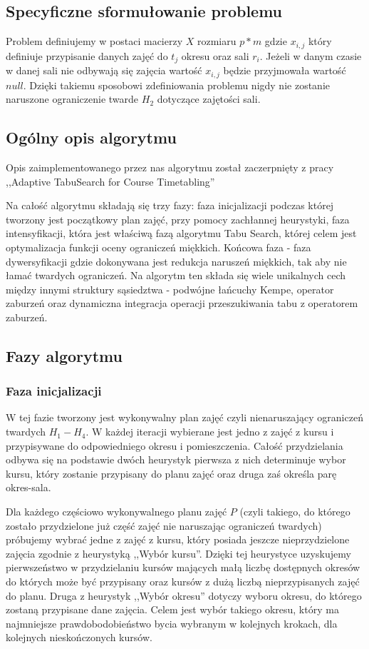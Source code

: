 \documentclass[11pt]{report}
\begin{document}
\subsection{Specyficzne sformułowanie problemu}
\par Problem definiujemy w postaci macierzy ${X}$  rozmiaru ${p * m}$ gdzie ${x_{i,j}}$ który definiuje przypisanie danych zajęć do ${t_{j}}$ okresu oraz sali ${r_{i}}$. Jeżeli w danym czasie w danej sali nie odbywają się zajęcia wartość ${x_{i,j}}$ będzie przyjmowała wartość ${null}$. Dzięki takiemu sposobowi zdefiniowania problemu nigdy nie zostanie naruszone ograniczenie twarde ${H_{2}}$ dotyczące zajętości sali.
\subsection{Ogólny opis algorytmu}
\par Opis zaimplementowanego przez nas algorytmu został zaczerpnięty z pracy ,,Adaptive TabuSearch for Course Timetabling'' \cite{tabu}
\par Na całość algorytmu składają się trzy fazy: faza inicjalizacji podczas której tworzony jest początkowy plan zajęć, przy pomocy zachłannej heurystyki, faza intensyfikacji, która jest właściwą fazą algorytmu Tabu Search, której celem jest optymalizacja funkcji oceny ograniczeń miękkich. Końcowa faza - faza dywersyfikacji gdzie dokonywana jest redukcja naruszeń miękkich, tak aby nie łamać twardych ograniczeń. Na algorytm ten składa się wiele unikalnych cech między innymi struktury sąsiedztwa - podwójne łańcuchy Kempe, operator zaburzeń oraz dynamiczna integracja operacji przeszukiwania tabu z operatorem zaburzeń.
\subsection{Fazy algorytmu}
\subsubsection{Faza inicjalizacji}
\par W tej fazie tworzony jest wykonywalny plan zajęć czyli nienaruszający ograniczeń twardych ${H_{1} - H_{4}}$. W każdej iteracji wybierane jest jedno z zajęć z kursu i przypisywane do odpowiedniego okresu i pomieszczenia. Całość przydzielania odbywa się na podstawie dwóch heurystyk pierwsza z nich determinuje wybor kursu, który zostanie przypisany do planu zajęć oraz druga zaś określa parę okres-sala.
\par Dla każdego częściowo wykonywalnego planu zajęć ${P}$ (czyli takiego, do którego zostało przydzielone już część zajęć nie naruszając ograniczeń twardych) próbujemy wybrać jedne z zajęć z kursu, który posiada jeszcze nieprzydzielone zajęcia zgodnie z heurystyką ,,Wybór kursu''. Dzięki tej heurystyce uzyskujemy pierwszeństwo w przydzielaniu kursów mających małą liczbę dostępnych okresów do których może być przypisany oraz kursów z dużą liczbą nieprzypisanych zajęć do planu. Druga z heurystyk ,,Wybór okresu'' dotyczy wyboru okresu, do którego zostaną przypisane dane zajęcia. Celem jest wybór takiego okresu, który ma najmniejsze prawdobodobieństwo bycia wybranym w kolejnych krokach, dla kolejnych nieskończonych kursów.
\end{document}
